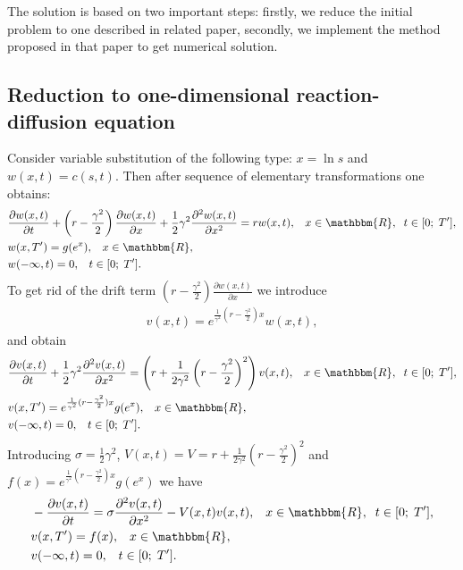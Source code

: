 \documentclass[11pt,a4paper]{extarticle}
\begin{document}
The solution is based on two important steps: firstly, we reduce the initial problem to one described in related paper, secondly, we implement the method proposed in that paper to get numerical solution.

\subsection{Reduction to one-dimensional reaction-diffusion equation}

Consider variable substitution of the following type: $x=\ln s$ and $w(x,t) = c(s, t)$. Then after sequence of elementary transformations one obtains:
\begin{equation}
	\begin{aligned}
		&\frac{\partial w(x,t)}{\partial t} + \left(r-\frac{\gamma^2}{2}\right) \frac{\partial w(x,t)}{\partial x} +
		\frac12 \gamma^2 \frac{\partial^2 w(x,t)}{\partial x^2} = rw(x,t),
		\;\;\;x \in \mathbbm{R},\;\; t \in [0;\;T^{\prime}],\\
		&w(x,T^{\prime}) = g(e^x), \;\;\; x \in \mathbbm{R},\\
		&w(-\infty,t) = 0, \;\;\; t \in [0;\;T^{\prime}].
	\end{aligned}
\end{equation}
To get rid of the drift term $\left(r-\frac{\gamma^2}{2}\right) \frac{\partial w(x,t)}{\partial x}$ we introduce
\begin{equation}
	\begin{aligned}
		v(x,t) = e^{\frac{1}{\gamma^2} (r-\frac{\gamma^2}{2})x} w(x,t),
	\end{aligned}
\end{equation}
and obtain
\begin{equation}
	\begin{aligned}
		&\frac{\partial v(x,t)}{\partial t} + \frac12 \gamma^2 \frac{\partial^2 v(x,t)}{\partial x^2} =
		\left( r +  \frac{1}{2\gamma^2} \left( r-\frac{\gamma^2}{2}\right)^2 \right) v(x,t),
	 	\;\;\;x \in \mathbbm{R},\;\; t \in [0;\;T^{\prime}],\\
		&v(x,T^{\prime}) = e^{\frac{1}{\gamma^2} (r-\frac{\gamma^2}{2})x} g(e^x), \;\;\; x \in \mathbbm{R},\\
		&v(-\infty,t) = 0, \;\;\; t \in [0;\;T^{\prime}].
	\end{aligned}
\end{equation}
Introducing
$\sigma = \frac12 \gamma^2$, $V(x,t) = V = r +  \frac{1}{2\gamma^2} \left( r-\frac{\gamma^2}{2}\right)^2$ and
$f(x) = e^{\frac{1}{\gamma^2} (r-\frac{\gamma^2}{2})x} g(e^x)$  we have
\begin{equation}
	\begin{aligned}
		&-\frac{\partial v(x,t)}{\partial t} = \sigma \frac{\partial^2 v(x,t)}{\partial x^2} - V(x,t) v(x,t),
		\;\;\;x \in \mathbbm{R},\;\; t \in [0;\;T^{\prime}],\\
		&v(x,T^{\prime}) = f(x), \;\;\; x \in \mathbbm{R},\\
		&v(-\infty,t) = 0, \;\;\; t \in [0;\;T^{\prime}].
	\end{aligned}
\end{equation}
\end{document}
